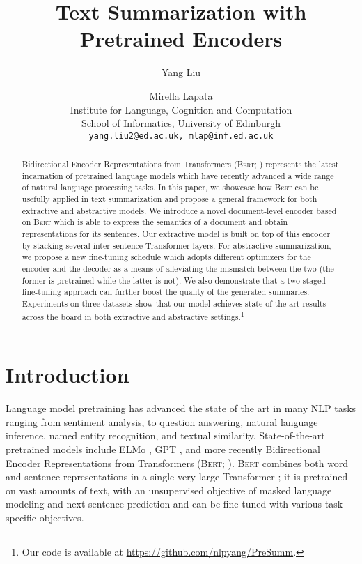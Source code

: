 \documentclass[11pt,a4paper]{article}
\title{Text Summarization with Pretrained Encoders}
\author{Yang Liu\and Mirella Lapata \\
    Institute for Language, Cognition and Computation
    \\
    School of Informatics, University of Edinburgh
    \\ 
    \texttt{yang.liu2@ed.ac.uk, mlap@inf.ed.ac.uk}
}
\date{}
\begin{document}
    \maketitle
    \begin{abstract}
        
        
        
        Bidirectional Encoder Representations from Transformers
        (\textsc{Bert}; \citealt{devlin2018bert}) represents the latest
        incarnation of pretrained language models which have recently
        advanced a wide range of natural language processing tasks.  In
        this paper, we showcase how \textsc{Bert} can be usefully applied
        in text summarization and propose a general framework for both
        extractive and abstractive models.  We introduce a novel
        document-level encoder based on \textsc{Bert} which is able to
        express the semantics of a document and obtain representations
        for its sentences. Our extractive model is built on top of this
        encoder by stacking several inter-sentence Transformer layers.
        For abstractive summarization, we propose a new fine-tuning
        schedule which adopts different optimizers for the encoder and
        the decoder as a means of alleviating the mismatch between the
        two (the former is pretrained while the latter is not). We also
        demonstrate that a two-staged fine-tuning approach can further
        boost the quality of the generated summaries. Experiments on
        three datasets show that our model achieves state-of-the-art
        results across the board in both extractive and abstractive
        settings.\footnote{Our code is available at
            \url{https://github.com/nlpyang/PreSumm}.}
    \end{abstract}
    
    \section{Introduction}
    \label{sec:introduction}
    
    Language model pretraining has advanced the state of the art in many
    NLP tasks ranging from sentiment analysis, to question answering,
    natural language inference, named entity recognition, and textual
    similarity. State-of-the-art pretrained models include ELMo
    \cite{peters2018deep}, GPT \cite{radford2018improving}, and more
    recently Bidirectional Encoder Representations from Transformers
    (\textsc{Bert}; \citealt{devlin2018bert}). \textsc{Bert} combines both
    word and sentence representations in a single very large Transformer
    \cite{vaswani2017attention}; it is pretrained on vast amounts of text,
    with an unsupervised objective of masked language modeling and
    next-sentence prediction and can be fine-tuned with various
    task-specific objectives.
    
\end{document}

